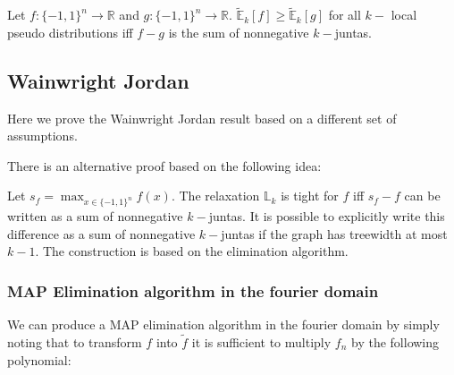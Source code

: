 
\begin{corollary}
Let $f:\{-1,1\}^n\rightarrow \mathbb{R}$ and $g:\{-1,1\}^n \rightarrow \mathbb{R}$. $\tilde{\mathbb{E}}_k[f] \geq \tilde{\mathbb{E}}_k[g]$ for all $k-$ local pseudo distributions iff $f-g$ is the sum of nonnegative $k-$juntas.
\end{corollary}




\subsection{Wainwright Jordan}

Here we prove the Wainwright Jordan result based on a different set of assumptions. 

There is an alternative proof based on the following idea:

Let $s_f = \max_{x \in \{-1,1\}^n} f(x)$. The relaxation $\mathbb{L}_k$ is tight for $f$ iff $s_f - f$ can be written as a sum of nonnegative $k-$juntas. It is possible to explicitly write this difference as a sum of nonnegative $k-$juntas if the graph has treewidth at most $k-1$. The construction is based on the elimination algorithm.








\subsubsection{MAP Elimination algorithm in the fourier domain}

We can produce a MAP elimination algorithm in the fourier domain by simply noting that to transform $f$ into $\tilde{f}$ it is sufficient to multiply $f_n$ by the following polynomial:

